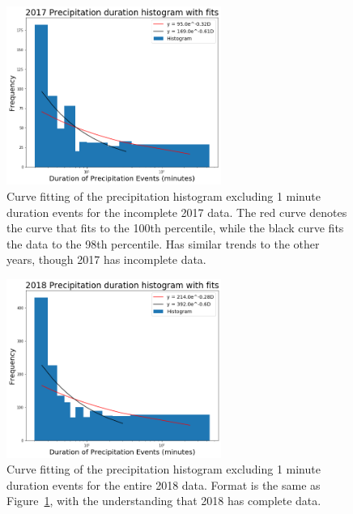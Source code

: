 \documentclass[11pt]{report}
\begin{document}
\clearpage
\begin{figure}[t]
\centering
\includegraphics[width=0.625\textwidth]{Figures/precip17_new.png}
\caption[2017 precipitation duration exponentials with contrasting curve
  fitting] {\label{precip17_redone}Curve fitting of the precipitation
  histogram excluding 1 minute duration events for the incomplete 2017
  data. The red curve denotes the curve that fits to the 100th percentile,
  while the black curve fits the data to the 98th percentile. Has similar
  trends to the other years, though 2017 has incomplete data.}
\end{figure}

\begin{figure}[b]
\centering
\includegraphics[width=0.625\textwidth]{Figures/precip18_new.png}
\caption[2018 precipitation duration exponentials with contrasting curve
  fitting] {\label{precip18_redone}Curve fitting of the precipitation
  histogram excluding 1 minute duration events for the entire 2018
  data. Format is the same as Figure~\ref{precip17_redone}, with the
  understanding that 2018 has complete data.}
\end{figure}

\clearpage
\end{document}
